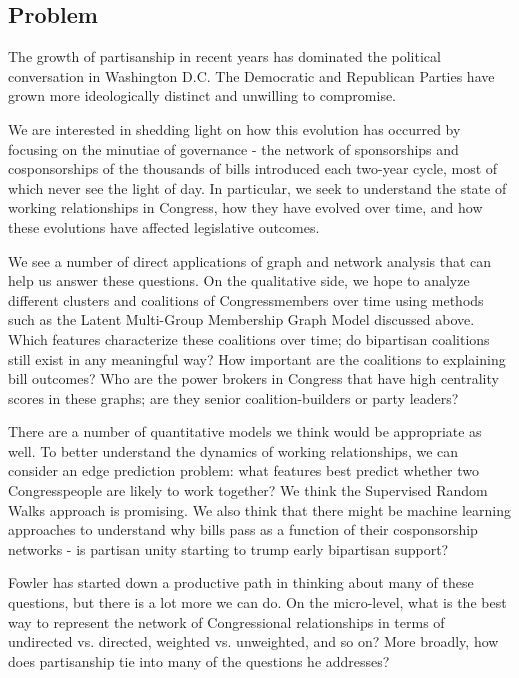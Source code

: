 \subsection{Problem}

The growth of partisanship in recent years has dominated the political
conversation in Washington D.C. The Democratic and Republican Parties have
grown more ideologically distinct and unwilling to compromise.

We are interested in shedding light on how this evolution has occurred by
focusing on the minutiae of governance - the network of sponsorships and
cosponsorships of the thousands of bills introduced each two-year cycle, most of
which never see the light of day. In particular, we seek to understand the state
of working relationships in Congress, how they have evolved over time, and how
these evolutions have affected legislative outcomes.

We see a number of direct applications of graph and network analysis that can
help us answer these questions. On the qualitative side, we hope to analyze
different clusters and coalitions of Congressmembers over time using methods
such as the Latent Multi-Group Membership Graph Model discussed above. Which
features characterize these coalitions over time; do bipartisan coalitions still
exist in any meaningful way? How important are the coalitions to explaining bill
outcomes? Who are the power brokers in Congress that have high centrality scores
in these graphs; are they senior coalition-builders or party leaders?

There are a number of quantitative models we think would be appropriate as well.
To better understand the dynamics of working relationships, we can consider an
edge prediction problem: what features best predict whether two Congresspeople
are likely to work together? We think the Supervised Random Walks approach is
promising. We also think that there might be machine learning approaches to
understand why bills pass as a function of their cosponsorship networks - is
partisan unity starting to trump early bipartisan support?

Fowler has started down a productive path in thinking about many of these
questions, but there is a lot more we can do. On the micro-level, what is the
best way to represent the network of Congressional relationships in terms of
undirected vs. directed, weighted vs. unweighted, and so on? More broadly, how
does partisanship tie into many of the questions he addresses?




